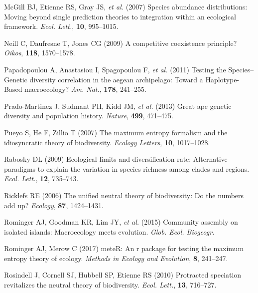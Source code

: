\documentclass[
]{article}
\newlength{\cslhangindent}
\newlength{\cslentryspacingunit} %
\newenvironment{CSLReferences}[2] %
 {%
  \setlength{\parindent}{0pt}
  \ifodd #1
  \let\oldpar\par
  \def\par{\hangindent=\cslhangindent\oldpar}
  \fi
  \setlength{\parskip}{#2\cslentryspacingunit}
 }%
 {}
\begin{document}
\begin{CSLReferences}{1}{0}
\leavevmode{}%
McGill BJ, Etienne RS, Gray JS, \emph{et al.} (2007) Species abundance
distributions: Moving beyond single prediction theories to integration
within an ecological framework. \emph{Ecol. Lett.}, \textbf{10},
995--1015.

\leavevmode{}%
Neill C, Daufresne T, Jones CG (2009) A competitive coexistence
principle? \emph{Oikos}, \textbf{118}, 1570--1578.

\leavevmode{}%
Papadopoulou A, Anastasiou I, Spagopoulou F, \emph{et al.} (2011)
Testing the {Species--Genetic} diversity correlation in the aegean
archipelago: Toward a {Haplotype-Based} macroecology? \emph{Am. Nat.},
\textbf{178}, 241--255.

\leavevmode{}%
Prado-Martinez J, Sudmant PH, Kidd JM, \emph{et al.} (2013) Great ape
genetic diversity and population history. \emph{Nature}, \textbf{499},
471--475.

\leavevmode{}%
Pueyo S, He F, Zillio T (2007) The maximum entropy formalism and the
idiosyncratic theory of biodiversity. \emph{Ecology Letters},
\textbf{10}, 1017--1028.

\leavevmode{}%
Rabosky DL (2009) Ecological limits and diversification rate:
Alternative paradigms to explain the variation in species richness among
clades and regions. \emph{Ecol. Lett.}, \textbf{12}, 735--743.

\leavevmode{}%
Ricklefs RE (2006) The unified neutral theory of biodiversity: Do the
numbers add up? \emph{Ecology}, \textbf{87}, 1424--1431.

\leavevmode{}%
Rominger AJ, Goodman KR, Lim JY, \emph{et al.} (2015) Community assembly
on isolated islands: Macroecology meets evolution. \emph{Glob. Ecol.
Biogeogr.}

\leavevmode{}%
Rominger AJ, Merow C (2017) meteR: An r package for testing the maximum
entropy theory of ecology. \emph{Methods in Ecology and Evolution},
\textbf{8}, 241--247.

\leavevmode{}%
Rosindell J, Cornell SJ, Hubbell SP, Etienne RS (2010) Protracted
speciation revitalizes the neutral theory of biodiversity. \emph{Ecol.
Lett.}, \textbf{13}, 716--727.


\end{CSLReferences}
\end{document}
